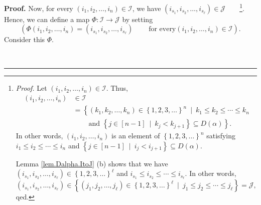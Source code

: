 \documentclass[numbers=enddot,12pt,final,onecolumn,notitlepage,abstracton]{scrartcl}
\theoremstyle{definition}
\newenvironment{proof}[1][Proof]{\noindent\textbf{#1.} }{\ \rule{0.5em}{0.5em}}
\newenvironment{verlong}{}{}
\begin{document}
\begin{verlong}
\begin{footnotesize}
\begin{proof}
Now, for every $\left(  i_{1},i_{2},\ldots,i_{n}\right)  \in\mathcal{I}$, we
have $\left(  i_{s_{1}},i_{s_{2}},\ldots,i_{s_{\ell}}\right)  \in\mathcal{J}%
$\ \ \ \ \footnote{\textit{Proof.} Let $\left(  i_{1},i_{2},\ldots
,i_{n}\right)  \in\mathcal{I}$. Thus,%
\begin{align*}
\left(  i_{1},i_{2},\ldots,i_{n}\right)   &  \in\mathcal{I}\\
&  =\left\{  \left(  k_{1},k_{2},\ldots,k_{n}\right)  \in\left\{
1,2,3,\ldots\right\}  ^{n}\ \mid\ k_{1}\leq k_{2}\leq\cdots\leq k_{n}\right.
\\
&  \ \ \ \ \ \ \ \ \ \ \left.  \text{and }\left\{  j\in\left[  n-1\right]
\ \mid\ k_{j}<k_{j+1}\right\}  \subseteq D\left(  \alpha\right)  \right\}  .
\end{align*}
In other words, $\left(  i_{1},i_{2},\ldots,i_{n}\right)  $ is an element of
$\left\{  1,2,3,\ldots\right\}  ^{n}$ satisfying $i_{1}\leq i_{2}\leq
\cdots\leq i_{n}$ and $\left\{  j\in\left[  n-1\right]  \ \mid\ i_{j}%
<i_{j+1}\right\}  \subseteq D\left(  \alpha\right)  $.
\par
Lemma \ref{lem.Dalpha.ItoJ} (b) shows that we have $\left(  i_{s_{1}}%
,i_{s_{2}},\ldots,i_{s_{\ell}}\right)  \in\left\{  1,2,3,\ldots\right\}
^{\ell}$ and $i_{s_{1}}\leq i_{s_{2}}\leq\cdots\leq i_{s_{\ell}}$. In other
words,%
\[
\left(  i_{s_{1}},i_{s_{2}},\ldots,i_{s_{\ell}}\right)  \in\left\{  \left(
j_{1},j_{2},\ldots,j_{\ell}\right)  \in\left\{  1,2,3,\ldots\right\}  ^{\ell
}\ \mid\ j_{1}\leq j_{2}\leq\cdots\leq j_{\ell}\right\}  =\mathcal{J},
\]
qed.}. Hence, we can define a map $\Phi:\mathcal{I}\rightarrow\mathcal{J}$ by
setting%
\[
\left(  \Phi\left(  i_{1},i_{2},\ldots,i_{n}\right)  =\left(  i_{s_{1}%
},i_{s_{2}},\ldots,i_{s_{\ell}}\right)  \ \ \ \ \ \ \ \ \ \ \text{for every
}\left(  i_{1},i_{2},\ldots,i_{n}\right)  \in\mathcal{I}\right)  .
\]
Consider this $\Phi$.


\end{proof}
\end{footnotesize}
\end{verlong}
\end{document}
